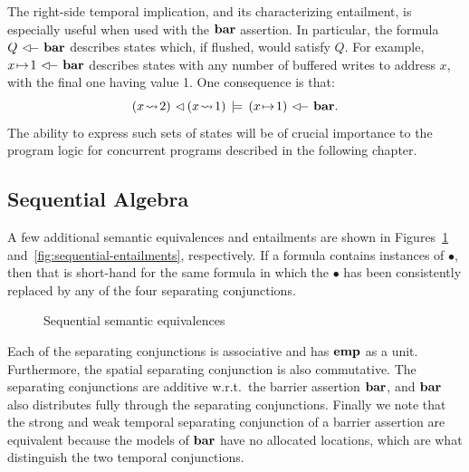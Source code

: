 \documentclass[11pt]{report}         %
\begin{document}
The right-side temporal implication, and its characterizing entailment,  is especially useful when used with the $\mathbf{bar}$ assertion. In particular, the formula $Q \fseqri \fbaru$ describes states which, if flushed, would satisfy $Q$. For example, $x \fpointsto 1 \fseqri \fbaru$ describes states with any number of buffered writes to address $x$, with the final one having value 1. One consequence is that: \[(x \fwriteu 2) \fseq (x \fwriteu 1) \sentails (x \fpointsto 1) \fseqri \fbaru.\] The ability to express such sets of states will be of crucial importance to the program logic for concurrent programs described in the following chapter. 


\subsection{Sequential Algebra}
\label{sec:sequential-algebra}

A few additional semantic equivalences and entailments are shown in Figures~\ref{fig:sequential-equivalences} and~\ref{fig:sequential-entailments}, respectively. If a formula contains instances of $\bullet$, then that is short-hand for the same formula in which the $\bullet$ has been consistently replaced by any of the four separating conjunctions. 

\begin{figure}[ht]
    \centering
    \caption{\label{fig:sequential-equivalences}Sequential semantic equivalences}
\end{figure}

Each of the separating conjunctions is associative and has $\mathbf{emp}$ as a unit. Furthermore, the spatial separating conjunction is also commutative. The separating conjunctions are additive w.r.t.\ the barrier assertion $\mathbf{bar}$, and $\mathbf{bar}$ also distributes fully through the separating conjunctions. Finally we note that the strong and weak temporal separating conjunction of a barrier assertion are equivalent because the models of $\mathbf{bar}$ have no allocated locations, which are what distinguish the two temporal conjunctions. 
\end{document}
